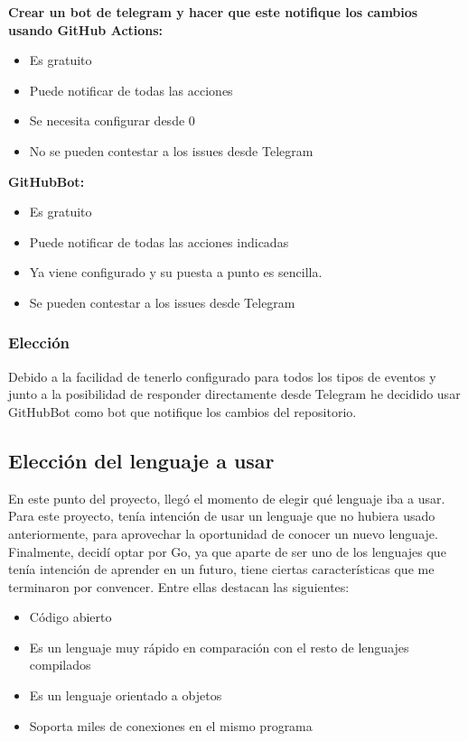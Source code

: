 \textbf{Crear un bot de telegram y hacer que este notifique los
cambios usando GitHub
Actions:}
\begin{itemize}
    \item Es gratuito
    \item Puede notificar de todas las acciones
    \item Se necesita configurar desde 0
    \item No se pueden contestar a los issues desde Telegram
\end{itemize}

\textbf{GitHubBot:}
\begin{itemize}
    \item Es gratuito
    \item Puede notificar de todas las acciones indicadas
    \item Ya viene configurado y su puesta a punto es sencilla.
    \item Se pueden contestar a los issues desde Telegram
\end{itemize}

\subsubsection{Elección}

Debido a la facilidad de tenerlo configurado para todos los tipos de
eventos y junto a la posibilidad de responder directamente desde
Telegram he decidido usar GitHubBot como bot que notifique los cambios del
repositorio.\\

\subsection{Elección del lenguaje a usar}

En este punto del proyecto, llegó el momento de elegir qué lenguaje iba a usar. Para este proyecto, tenía intención de usar un
lenguaje que no hubiera usado anteriormente, para aprovechar la oportunidad de conocer un nuevo lenguaje.\\

Finalmente, decidí optar por Go, ya que aparte de ser uno de los lenguajes que tenía intención de aprender en un futuro, tiene ciertas
características que me terminaron por convencer. Entre ellas destacan las siguientes:

\begin{itemize}
    \item Código abierto
    \item Es un lenguaje muy rápido en comparación con el resto de lenguajes compilados
    \item Es un lenguaje orientado a objetos 
    \item Soporta miles de conexiones en el mismo programa
\end{itemize}

